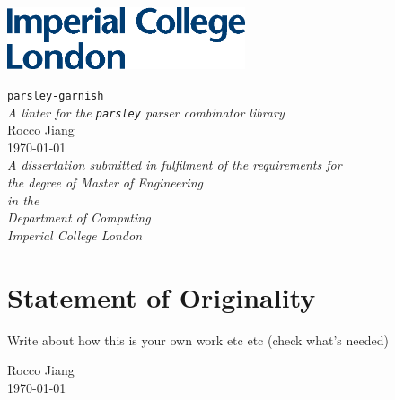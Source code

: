 \documentclass[a4paper, 10pt]{report}
\providecommand{\chaptertitle}{}
\newcommand{\ourchapterstar}[1]{\pagebreak\chapter*{#1}\renewcommand{\chaptertitle}{}}
\newcommand{\authorname}{Rocco Jiang}
\newcommand{\maintitle}{\texttt{parsley-garnish}}
\newcommand{\mainsubtitle}{\emph{A linter for the \texttt{parsley} parser combinator library}}
\newcommand{\TODO}[1]{{\color{DarkRed}#1}}
\begin{document}

\hypersetup{pageanchor=false}
\begin{titlepage}
    \vspace*{-13.5mm}\hspace{-30.6mm}\hspace{17.5mm}\includegraphics[width=7cm]{assets/logo.eps}
    \vspace*{\fill}
    \begin{center}
      {\Huge{\maintitle}}\\[0.4cm]
      {\Large{\mainsubtitle}}\\[1.6cm]
      {\Large{\authorname}}\\[0.2cm]
      {\today}\\[4.0cm]
      \vspace*{\fill}
      {\emph{A dissertation submitted in fulfilment of the requirements for\\ the degree of Master of Engineering}}\\[0.3cm]
      {\emph{in the}}\\[0.4cm]
      {\emph{Department of Computing}}\\
      {\emph{Imperial College London}}\\
    \end{center}
\end{titlepage}

\clearpage %
\setcounter{page}{1}
\setcounter{tocdepth}{2}
\hypersetup{pageanchor=true}

% 

\ourchapterstar{Statement of Originality}
\TODO{Write about how this is your own work etc etc (check what's needed)}

\begin{flushright}
\authorname\\
\today
\end{flushright}

% 

\pagebreak
\tableofcontents
\pagebreak
\listoffigures

\pagebreak
{}

%
%
%
%
%

\pagebreak
{}
\renewcommand{\chaptertitle}{Bibliography}
\printbibliography[heading=bibintoc]

\pagebreak
\renewcommand{\chaptertitle}{Appendices}
\appendix
%
\end{document}
